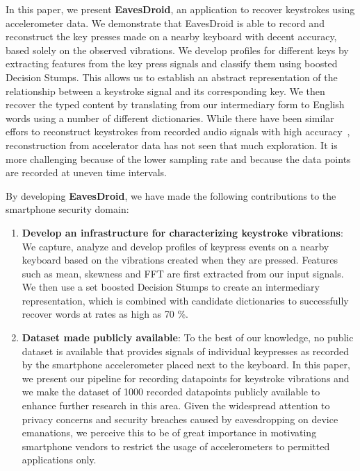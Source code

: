 \documentclass[11pt,conference]{IEEEtran}
\begin{document}
\noindent In this paper, we present \textbf{EavesDroid}, an application to recover keystrokes using 
accelerometer data. We demonstrate that EavesDroid is able to record and reconstruct the key presses made on a nearby keyboard with decent accuracy, based solely on the observed vibrations. We develop profiles for different keys by extracting features from the key press signals and classify them using boosted Decision Stumps. This allows us to establish an abstract representation of the relationship between a keystroke signal and its corresponding key. We then recover the typed content
by translating from our intermediary form to English words using a number
of different dictionaries.
While there have been similar effors to reconstruct keystrokes from recorded audio signals with high accuracy~\cite{zhuang2005keyboard},
 reconstruction from accelerator data has not seen that much exploration. It is more challenging because of the lower sampling rate and because the data points are recorded at uneven time intervals.

\noindent By developing \textbf{EavesDroid}, we have made the following contributions to the smartphone security domain:
\begin{enumerate}
\item {\bf Develop an infrastructure for characterizing keystroke vibrations}: We
capture, analyze and develop profiles of keypress events on a nearby
keyboard based on the vibrations created when they are pressed. Features such as mean, skewness and FFT are first extracted from our input signals. We then use a set boosted Decision Stumps to create an intermediary
representation, which is combined with candidate dictionaries
to successfully recover words at rates as high as 70 \%.
\item {\bf Dataset made publicly available}: To the best of our knowledge,
no public dataset is available that provides signals of individual keypresses as recorded by the smartphone accelerometer placed next to the keyboard. In this paper, we present our pipeline for recording datapoints for keystroke vibrations and we make the dataset of 1000 recorded datapoints publicly available to enhance further research in this area. Given
the widespread attention to privacy concerns and security breaches caused by eavesdropping on device emanations, we perceive this to be
of great importance in motivating smartphone vendors
to restrict the usage of accelerometers to permitted applications only.\\
\end{enumerate}
\end{document}
